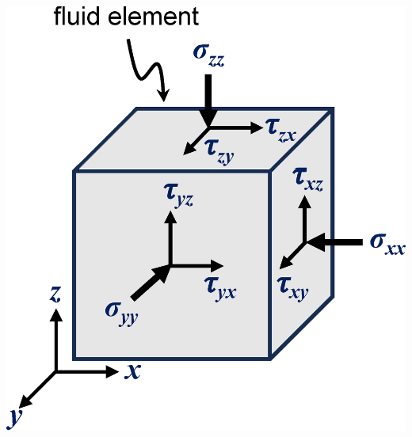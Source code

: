 \documentclass[a4paper]{article}
\begin{document}
\begin{minipage}{.3\textwidth}
    \includegraphics[width=\textwidth]{img/stress_tensor.eps}
\end{minipage}
\end{document}
